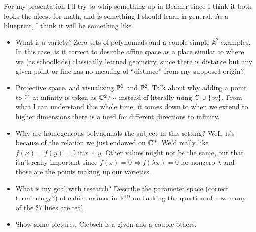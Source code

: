 \documentclass[12pt]{article}
\begin{document}
For my presentation I'll try to whip something up in Beamer since I think it both
looks the nicest for math, and is something I should learn in general.
As a blueprint, I think it will be something like
\begin{itemize}
  \item What is a variety? Zero-sets of polynomials and a couple simple $\mathbb{A}^{2}$ examples.
        In this case, is it correct to describe affine space as a place similar to where
        we (as schoolkids) classically learned geometry, since there is distance but
        any given point or line has no meaning of ``distance'' from any supposed origin?
  \item Projective space, and visualizing $\PP[1]$ and $\PP[2]$.
        Talk about why adding a point to $\CC$ at infinity is taken
        as $\CC[2]/\negmedspace\sim$ instead of literally using $\CC \cup \set{\infty}$.
        From what I can understand this whole time, it comes down to when we extend to
        higher dimensions there is a need for different directions to infinity.

  \item Why are homogeneous polynomials the subject in this setting?
        Well, it's because of the relation we just endowed on $\CC[n]$.
        We'd really like $f(x) = f(y) = 0$ if $x \sim y$. Other values might not be the same,
        but that isn't really important since $f(x) = 0 \iff f(\lambda x) = 0$ for nonzero $\lambda$
        and those are the points making up our varieties.

  \item What is my goal with research?
        Describe the parameter space (correct terminology?) of cubic surfaces in $\PP[19]$
        and asking the question of how many of the 27 lines are real.

  \item Show some pictures, Clebsch is a given and a couple others.
\end{itemize}
\end{document}
